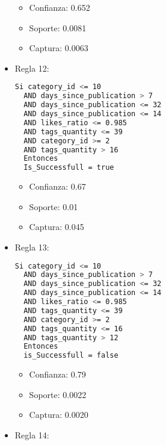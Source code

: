 \begin{itemize}
    \begin{itemize}
      \item Confianza: 0.652
      \item Soporte: 0.0081
      \item Captura: 0.0063
    \end{itemize}

  \item Regla 12:

\begin{lstlisting}[language=bash, numbers=none]
  Si category_id <= 10
  AND days_since_publication > 7
  AND days_since_publication <= 32
  AND days_since_publication <= 14
  AND likes_ratio <= 0.985
  AND tags_quantity <= 39
  AND category_id >= 2
  AND tags_quantity > 16
  Entonces
  Is_Successfull = true
\end{lstlisting}

    \begin{itemize}
      \item Confianza: 0.67
      \item Soporte: 0.01
      \item Captura: 0.045
    \end{itemize}

  \item Regla 13:

\begin{lstlisting}[language=bash, numbers=none]
  Si category_id <= 10
  AND days_since_publication > 7
  AND days_since_publication <= 32
  AND days_since_publication <= 14
  AND likes_ratio <= 0.985
  AND tags_quantity <= 39
  AND category_id >= 2
  AND tags_quantity <= 16
  AND tags_quantity > 12
  Entonces
  is_Successfull = false
\end{lstlisting}

    \begin{itemize}
      \item Confianza: 0.79
      \item Soporte: 0.0022
      \item Captura: 0.0020
    \end{itemize}

  \item Regla 14:


\end{itemize}
